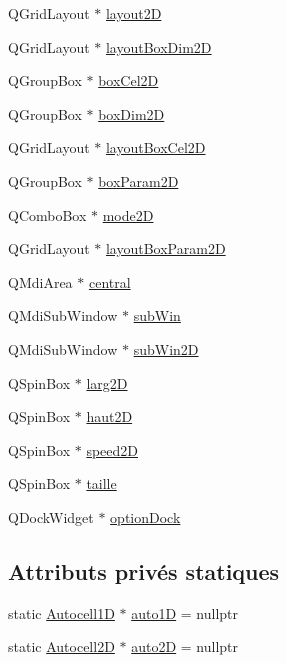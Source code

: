 \begin{DoxyCompactItemize}
Q\+Grid\+Layout $\ast$ \hyperlink{class_main_window_a648672720c15d3b363c131c91408422d}{layout2D}
\item 
Q\+Grid\+Layout $\ast$ \hyperlink{class_main_window_a7ab6b649b9761ce29bcda27ebbbe9ccd}{layout\+Box\+Dim2D}
\item 
Q\+Group\+Box $\ast$ \hyperlink{class_main_window_a1d591f82ca53c455c4a5204f8baad925}{box\+Cel2D}
\item 
Q\+Group\+Box $\ast$ \hyperlink{class_main_window_ad25e047b431ec6c6d244c9d4a3355582}{box\+Dim2D}
\item 
Q\+Grid\+Layout $\ast$ \hyperlink{class_main_window_a69d0a438a34120f96b7394136ee13a15}{layout\+Box\+Cel2D}
\item 
Q\+Group\+Box $\ast$ \hyperlink{class_main_window_aa758e230a66e84a946b125af5df55618}{box\+Param2D}
\item 
Q\+Combo\+Box $\ast$ \hyperlink{class_main_window_aaba4f5a028019a18aae76c21d3ffa0d5}{mode2D}
\item 
Q\+Grid\+Layout $\ast$ \hyperlink{class_main_window_af5faffe7dcb929efd6cf1a1b823c99a1}{layout\+Box\+Param2D}
\item 
Q\+Mdi\+Area $\ast$ \hyperlink{class_main_window_a9c7c0dfa79f78e05a3745962c680cd18}{central}
\item 
Q\+Mdi\+Sub\+Window $\ast$ \hyperlink{class_main_window_ac18cc180f7f4908f63ce91487bf044cd}{sub\+Win}
\item 
Q\+Mdi\+Sub\+Window $\ast$ \hyperlink{class_main_window_a9e6a20036bfb2fe795858f32b0f72282}{sub\+Win2D}
\item 
Q\+Spin\+Box $\ast$ \hyperlink{class_main_window_af66e8d082f97a24629399dec9da7aa03}{larg2D}
\item 
Q\+Spin\+Box $\ast$ \hyperlink{class_main_window_aea127325b7c01f02b7a98b17595326bb}{haut2D}
\item 
Q\+Spin\+Box $\ast$ \hyperlink{class_main_window_a062e8ba0040a577871dd29cadbade31b}{speed2D}
\item 
Q\+Spin\+Box $\ast$ \hyperlink{class_main_window_a4ee0dd35b93263abed8d50c2517632e2}{taille}
\item 
Q\+Dock\+Widget $\ast$ \hyperlink{class_main_window_a2cfa6cfbdcaba78e37d9dd17847dd620}{option\+Dock}
\end{DoxyCompactItemize}
\subsection*{Attributs privés statiques}
\begin{DoxyCompactItemize}
\item 
static \hyperlink{class_autocell1_d}{Autocell1D} $\ast$ \hyperlink{class_main_window_a252b3e10b17bf529c25b4e72be4b4332}{auto1D} = nullptr
\item 
static \hyperlink{class_autocell2_d}{Autocell2D} $\ast$ \hyperlink{class_main_window_ae1a48aa4de447712675f3aa2d7482034}{auto2D} = nullptr
\end{DoxyCompactItemize}


